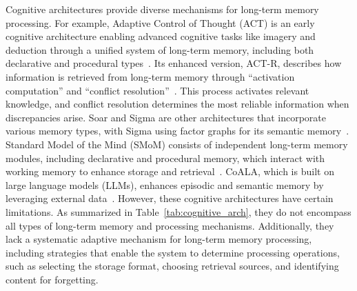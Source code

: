 \documentclass[journal,hideappendix]{vgtc}
\begin{document}
Cognitive architectures provide diverse mechanisms for long-term memory processing. For example, Adaptive Control of Thought (ACT) is an early cognitive architecture enabling advanced cognitive tasks like imagery and deduction through a unified system of long-term memory, including both declarative and procedural types~\cite{anderson2013architecture}. Its enhanced version, ACT-R, describes how information is retrieved from long-term memory through ``activation computation'' and ``conflict resolution''~\cite{lebiere1993connectionist,anderson1997act,whitehill2013understanding}. This process activates relevant knowledge, and conflict resolution determines the most reliable information when discrepancies arise. Soar and Sigma are other architectures that incorporate various memory types, with Sigma using factor graphs for its semantic memory~\cite{rosenbloom2016sigma}. 
Standard Model of the Mind (SMoM) consists of independent long-term memory modules, including declarative and procedural memory, which interact with working memory to enhance storage and retrieval~\cite{laird2017standard}. CoALA, which is built on large language models (LLMs), enhances episodic and semantic memory by leveraging external data~\cite{sumers2023cognitive}. However, these cognitive architectures have certain limitations. 
As summarized in Table~\ref{tab:cognitive_arch}, they do not encompass all types of long-term memory and processing mechanisms. Additionally, they lack a systematic adaptive mechanism for long-term memory processing, including strategies that enable the system to determine processing operations, such as selecting the storage format, choosing retrieval sources, and identifying content for forgetting.

\end{document}
